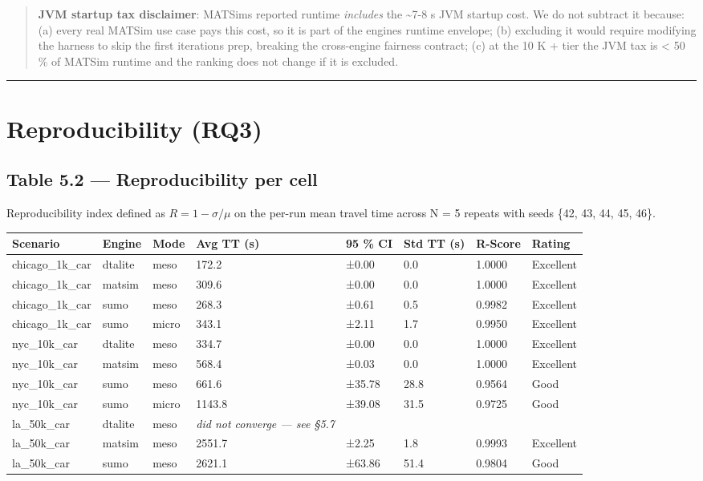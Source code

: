 \begin{quote}
\textbf{JVM startup tax disclaimer}: MATSim\textquotesingle s reported
runtime \emph{includes} the \textasciitilde7-8 s JVM startup cost. We do
not subtract it because: (a) every real MATSim use case pays this cost,
so it is part of the engine\textquotesingle s runtime envelope; (b)
excluding it would require modifying the harness to skip the first
iteration\textquotesingle s prep, breaking the cross-engine fairness
contract; (c) at the 10 K + tier the JVM tax is \textless{} 50 \% of
MATSim runtime and the ranking does not change if it is excluded.
\end{quote}

\begin{center}\rule{0.5\linewidth}{0.5pt}\end{center}

\section{Reproducibility (RQ3)}\label{52-reproducibility-rq3}

\subsection{Table 5.2 --- Reproducibility per
cell}\label{table-52--reproducibility-per-cell}

Reproducibility index defined as \(R = 1 - \sigma/\mu\) on the per-run
mean travel time across N = 5 repeats with seeds \{42, 43, 44, 45, 46\}.

\begin{longtable}[]{@{}llllllll@{}}
\toprule\noalign{}
Scenario & Engine & Mode & Avg TT (s) & 95 \% CI & Std TT (s) & R-Score
& Rating \\
\midrule\noalign{}
\endhead
\bottomrule\noalign{}
\endlastfoot
chicago\_1k\_car & dtalite & meso & 172.2 & ±0.00 & 0.0 & 1.0000 &
Excellent \\
chicago\_1k\_car & matsim & meso & 309.6 & ±0.00 & 0.0 & 1.0000 &
Excellent \\
chicago\_1k\_car & sumo & meso & 268.3 & ±0.61 & 0.5 & 0.9982 &
Excellent \\
chicago\_1k\_car & sumo & micro & 343.1 & ±2.11 & 1.7 & 0.9950 &
Excellent \\
nyc\_10k\_car & dtalite & meso & 334.7 & ±0.00 & 0.0 & 1.0000 &
Excellent \\
nyc\_10k\_car & matsim & meso & 568.4 & ±0.03 & 0.0 & 1.0000 &
Excellent \\
nyc\_10k\_car & sumo & meso & 661.6 & ±35.78 & 28.8 & 0.9564 & Good \\
nyc\_10k\_car & sumo & micro & 1143.8 & ±39.08 & 31.5 & 0.9725 & Good \\
la\_50k\_car & dtalite & meso & \emph{did not converge --- see §5.7} & &
& & \\
la\_50k\_car & matsim & meso & 2551.7 & ±2.25 & 1.8 & 0.9993 &
Excellent \\
la\_50k\_car & sumo & meso & 2621.1 & ±63.86 & 51.4 & 0.9804 & Good \\
\end{longtable}

